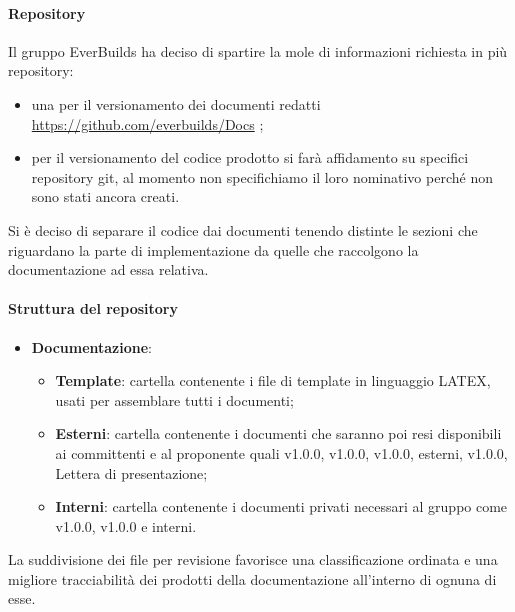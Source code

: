             \paragraph{Repository}
                Il gruppo EverBuilds ha deciso di spartire la mole di informazioni richiesta in più repository:
                \begin{itemize}
                    \item una per il versionamento dei documenti redatti \url{https://github.com/everbuilds/Docs} ;
                    \item per il versionamento del codice prodotto si farà affidamento su specifici repository git, al momento non specifichiamo il loro nominativo perché non sono stati ancora creati.
                \end{itemize}
                Si è deciso di separare il codice dai documenti tenendo distinte le sezioni che riguardano la parte di implementazione da quelle che raccolgono la documentazione ad essa relativa.\\
            \paragraph{Struttura del repository}
                \begin{itemize}
                    \item\textbf{Documentazione}:
                        \begin{itemize}
                            \item\textbf{Template}: cartella contenente i file di template in linguaggio LATEX, usati per assemblare tutti i documenti;
                            \item\textbf{Esterni}: cartella contenente i documenti che saranno poi resi disponibili ai committenti e al proponente quali  v1.0.0,  v1.0.0,  v1.0.0,  esterni,  v1.0.0, Lettera di presentazione;
                            \item\textbf{Interni}: cartella contenente i documenti privati necessari al gruppo come  v1.0.0,  v1.0.0 e  interni.
                            
                        \end{itemize}
                \end{itemize}
                La suddivisione dei file per revisione favorisce una classificazione ordinata e una migliore tracciabilità dei prodotti della documentazione all’interno di ognuna di esse.
